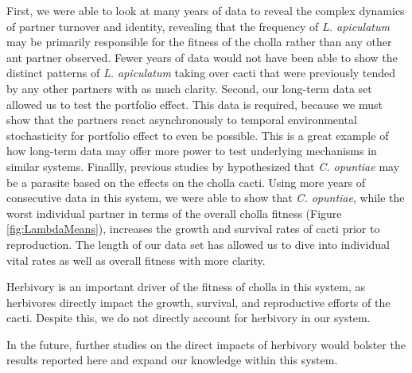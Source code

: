 \documentclass[11pt]{article}
\begin{document}
First, we were able to look at many years of data to reveal the complex dynamics of partner turnover and identity, revealing that the frequency of \textit{L. apiculatum} may be primarily responsible for the fitness of the cholla rather than any other ant partner observed.
Fewer years of data would not have been able to show the distinct patterns of \textit{L. apiculatum} taking over cacti that were previously tended by any other partners with as much clarity.
Second, our long-term data set allowed us to test the portfolio effect.
This data is required, because we must show that the partners react asynchronously to temporal environmental stochasticity for portfolio effect to even be possible.
This is a great example of how long-term data may offer more power to test underlying mechanisms in similar systems.
Finallly, previous studies by \cite{Miller2007} hypothesized that \textit{C. opuntiae} may be a parasite based on the effects on the cholla cacti.
Using more years of consecutive data in this system, we were able to show that \textit{C. opuntiae}, while the worst individual partner in terms of the overall cholla fitness (Figure \ref{fig:LambdaMeans}), increases the growth and survival rates of cacti prior to reproduction.
The length of our data set has allowed us to dive into individual vital rates as well as overall fitness with more clarity.


Herbivory is an important driver of the fitness of cholla in this system, as herbivores directly impact the growth, survival, and reproductive efforts of the cacti.
Despite this, we do not directly account for herbivory in our system. 

In the future, further studies on the direct impacts of herbivory would bolster the results reported here and expand our knowledge within this system.
\end{document}

